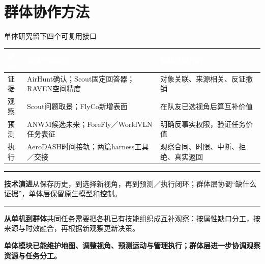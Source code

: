 \documentclass[aspectratio=169,10pt]{beamer}
\def\slidesource{}
\newcommand{\takeaway}[1]{\par\begin{takebox}\fontsize{9.1}{11.5}\selectfont\bfseries\color{navy}#1\end{takebox}}
\newcommand{\ph}[1]{{\color{teal}\rule[-0.35mm]{0.8mm}{3.1mm}}\hspace{1.1mm}\textbf{\color{navy}#1}}
\newcommand{\thd}[1]{\textcolor{white}{\bfseries #1}}
\begin{document}
\section{群体协作方法}
\gdef\slidesource{文献分析：\href{https://arxiv.org/html/2606.14772v1}{[12] ScoutVLA}；\href{https://arxiv.org/html/2601.07558v1}{[14] FlyCo}；\href{https://arxiv.org/html/2610.25407v1}{[24] AeroDASH}；\href{https://arxiv.org/html/2607.18060v3}{[29] RoboHarness（编排）}}
\begin{frame}[t,label=single_to_group]{单体研究留下四个可复用接口}
\relax
{\fontsize{8.7}{11.1}\selectfont
{}
\begin{tabularx}{\linewidth}{@{}Y{0.48}Y{1.53}Y{0.99}@{}}\toprule
{}\thd{接口} & \thd{单体文献给的} & \thd{群体还要补的}\\\midrule
证据 & AirHunt确认；Scout固定回答器；RAVEN空间精度 & 对象关联、来源相关、反证撤销\\
观察 & Scout问题取景；FlyCo新增表面 & 在队友已选视角后算互补价值\\
预测 & ANWM候选未来；ForeFly／WorldVLN任务表征 & 明确反事实权限，验证任务价值\\
执行 & AeroDASH时间接轨；两篇harness工具／交接 & 观察合同、时限、中断、拒绝、真实返回\\
\bottomrule\end{tabularx}\par}
\par\ph{技术演进}\quad 从保存历史，到选择新视角，再到预测／执行闭环；群体层协调“缺什么证据”，单体层保留原生模型和控制。\par\vspace{1mm}
\par\ph{从单机到群体}\quad 共同任务需要把各机已有技能组织成互补观察：按属性缺口分工，按来源与时效融合，再根据新观察更新决策。\par\vspace{1mm}
\takeaway{单体模块已能维护地图、调整视角、预测运动与管理执行；群体层进一步协调观察资源与任务分工。}

\end{frame}
\gdef\slidesource{\href{https://arxiv.org/html/2505.09108v1}{[11] Air-Ground} · §3–6；Figs.2–5；Tables 6–7}
\end{document}
